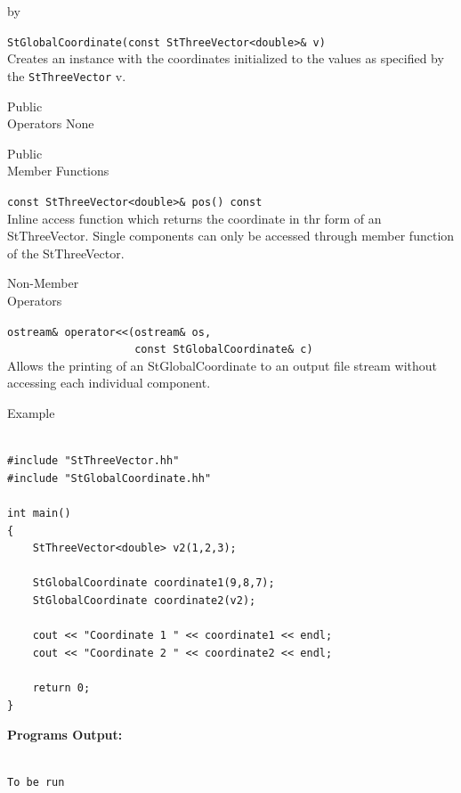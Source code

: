 \documentclass[twoside]{article}
\newcommand{\comp}[1]{\texttt{#1}}%
\newcommand{\entrylabel}[1]{\mbox{\textbf{{#1}}}\hfil}%
\newenvironment{entry}
{\begin{list}{}%
    {\renewcommand{\makelabel}{\entrylabel}%
     \setlength{\labelwidth}{90pt}%
     \setlength{\leftmargin}{\labelwidth}
     \advance\leftmargin by \labelsep%
      }%
    }%
  {\end{list}}
\newcommand{\Entrylabel}[1]%
{\raisebox{0pt}[1ex][0pt]{\makebox[\labelwidth][l]%
    {\parbox[t]{\labelwidth}{\hspace{0pt}\textbf{{#1}}}}}}
\newenvironment{Entry}%
{\renewcommand{\entrylabel}{\Entrylabel}\begin{entry}}%
  {\end{entry}}
\begin{document}
\begin{Entry}
   \verb+StGlobalCoordinate(const StThreeVector<double>& v)+\\
   Creates an instance with the coordinates initialized to
   the values as specified by the \comp{StThreeVector} v.

\item[Public \\ Operators]
   None

\item[Public \\ Member Functions]

  \verb+const StThreeVector<double>& pos() const+\\
  Inline access function which returns the coordinate in thr
  form of an StThreeVector.  Single components can only be accessed
  through member function of the StThreeVector. 

\item[Non-Member \\ Operators]

  \verb+ostream& operator<<(ostream& os,+\\
  \verb+                    const StGlobalCoordinate& c)+\\
  Allows the printing of an StGlobalCoordinate to an output file stream
  without accessing each individual component.

\item[Example]

{\footnotesize
\begin{verbatim}

#include "StThreeVector.hh"
#include "StGlobalCoordinate.hh"

int main()
{
    StThreeVector<double> v2(1,2,3);

    StGlobalCoordinate coordinate1(9,8,7);
    StGlobalCoordinate coordinate2(v2);
    
    cout << "Coordinate 1 " << coordinate1 << endl;
    cout << "Coordinate 2 " << coordinate2 << endl;

    return 0;
}
\end{verbatim}
}%
{\bf Programs Output:}
{\footnotesize
\begin{verbatim}

To be run

\end{verbatim}
} %

\end{Entry}
\clearpage

%
%
\end{document}
